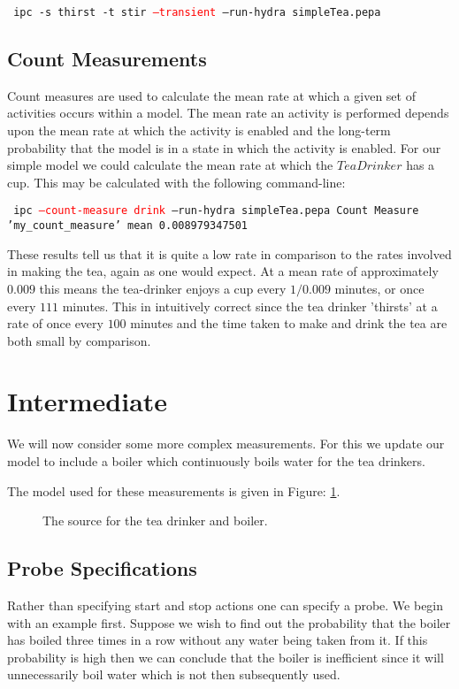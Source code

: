 \documentclass[10pt,a4paper]{article}
\begin{document}
\noindent
\texttt{
ipc -s thirst -t stir \textcolor{red}{--transient} --run-hydra simpleTea.pepa
}

\subsection{Count Measurements}
Count measures are used to calculate the mean rate at which a given set of
activities occurs within a model. The mean rate an activity is performed
depends upon the mean rate at which the activity is enabled and the
long-term probability that the model is in a state in which the activity
is enabled.
For our simple model we could calculate the mean rate at which the
$TeaDrinker$ has a cup. This may be calculated with the following
command-line:

\noindent
\texttt{
ipc \textcolor{red}{--count-measure drink} --run-hydra simpleTea.pepa
\newline
Count Measure 'my\_count\_measure'
  mean                0.008979347501
}

These results tell us that it is quite a low rate in comparison to
the rates involved in making the tea, again as one would expect.
At a mean rate of approximately $0.009$ this means the tea-drinker
enjoys a cup every $1/0.009$ minutes, or once every $111$ minutes.
This in intuitively correct since the tea drinker 'thirsts' 
at a rate of once every $100$ minutes and the time taken to make and
drink the tea are both small by comparison.


\section{Intermediate}

We will now consider some more complex measurements.
For this we update our model to include a boiler which continuously
boils water for the tea drinkers.

The model used for these measurements is given in Figure:
\ref{figure:pepafile:boiler}.

\begin{figure}[htb]

\caption{
\label{figure:pepafile:boiler}
The source for the tea drinker and boiler.
}
\end{figure}

\subsection{Probe Specifications}
Rather than specifying start and stop actions one can specify
a probe. We begin with an example first.
Suppose we wish to find out the probability that the boiler has boiled
three times in a row without any water being taken from it.
If this probability is high then we can conclude that the boiler is
inefficient since it will unnecessarily boil water which is not then
subsequently used.
\end{document}
